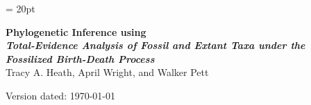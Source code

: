 \documentclass[11pt]{article}
\begin{document}
\renewcommand{\headrulewidth}{0.5pt}
\headsep = 20pt
\lhead{ }

\thispagestyle{plain}
\begin{center}

\textbf{\LARGE Phylogenetic Inference using \RevBayes}\\\vspace{2mm}
\textbf{\it{\Large Total-Evidence Analysis of Fossil and Extant Taxa under the Fossilized Birth-Death Process}}\\\vspace{2mm}
\vspace{1cm}
{\Large Tracy A. Heath, April Wright, and Walker Pett}
\vspace{1cm}
\end{center}

\def \ResourcePath {./}
\def \GlobalResourcePath {../}


Version dated: \today
\end{document}
